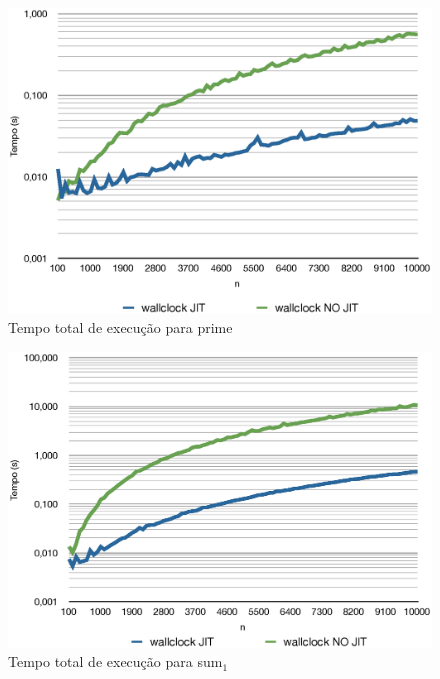 \begin{figure}[ht!]
  \centering
  \includegraphics[scale=0.70]{figs/prime_tempo}
  \caption{Tempo total de execução para prime \label{fig:prime-tempo}}
\end{figure}
\begin{figure}[ht!]
  \centering
  \includegraphics[scale=0.70]{figs/sum1_tempo}
  \caption{Tempo total de execução para sum$_1$ \label{fig:sum1-tempo}}
\end{figure}
